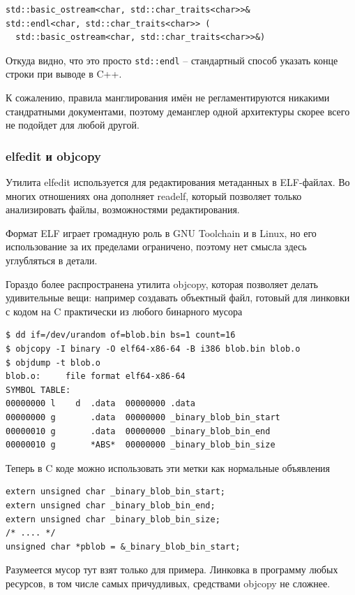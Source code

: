 \documentclass[a4paper,12pt,oneside]{article}
\begin{document}
\begin{lstlisting}
std::basic_ostream<char, std::char_traits<char>>& 
std::endl<char, std::char_traits<char>> (
  std::basic_ostream<char, std::char_traits<char>>&)
\end{lstlisting}

Откуда видно, что это просто \lstinline!std::endl! -- стандартный способ указать конце строки при выводе в C++.

К сожалению, правила манглирования имён не регламентируются никакими стандратными документами, поэтому деманглер одной архитектуры скорее всего не подойдет для любой другой.

\subsubsection{elfedit и objcopy}\label{subsubsec:Objcopy}

Утилита elfedit используется для редактирования метаданных в ELF-файлах. Во многих отношениях она дополняет readelf, который позволяет только анализировать файлы, возможностями редактирования.

Формат ELF играет громадную роль в GNU Toolchain и в Linux, но его использование за их пределами ограничено, поэтому нет смысла здесь углубляться в детали.

Гораздо более распространена утилита objcopy, которая позволяет делать удивительные вещи: например создавать объектный файл, готовый для линковки с кодом на C практически из любого бинарного мусора

\begin{verbatim}
$ dd if=/dev/urandom of=blob.bin bs=1 count=16
$ objcopy -I binary -O elf64-x86-64 -B i386 blob.bin blob.o
$ objdump -t blob.o
blob.o:     file format elf64-x86-64
SYMBOL TABLE:
00000000 l    d  .data	00000000 .data
00000000 g       .data	00000000 _binary_blob_bin_start
00000010 g       .data	00000000 _binary_blob_bin_end
00000010 g       *ABS*	00000000 _binary_blob_bin_size
\end{verbatim}

Теперь в C коде можно использовать эти метки как нормальные объявления

\begin{lstlisting}
extern unsigned char _binary_blob_bin_start;
extern unsigned char _binary_blob_bin_end;
extern unsigned char _binary_blob_bin_size;
/* .... */
unsigned char *pblob = &_binary_blob_bin_start;
\end{lstlisting}

Разумеется мусор тут взят только для примера. Линковка в программу любых ресурсов, в том числе самых причудливых, средствами objcopy не сложнее.
\end{document}
